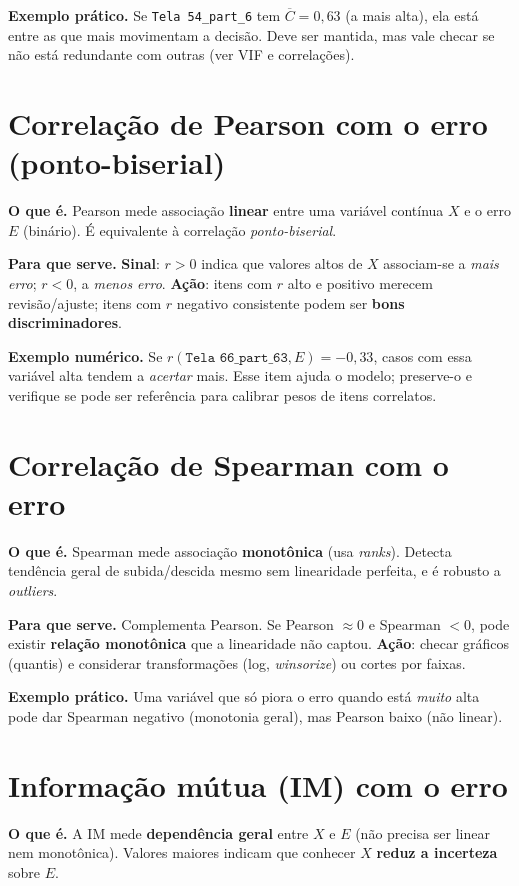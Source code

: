 \documentclass[12pt,a4paper]{article}
\begin{document}
\textbf{Exemplo prático.} Se \texttt{Tela 54\_part\_6} tem $\overline{C}=0{,}63$ (a mais alta), ela está entre as que mais movimentam a decisão. Deve ser mantida, mas vale checar se não está redundante com outras (ver VIF e correlações).

\section{Correlação de Pearson com o erro (ponto-biserial)}\label{sec:pearson}
\textbf{O que é.} Pearson mede associação \textbf{linear} entre uma variável contínua $X$ e o erro $E$ (binário). É equivalente à correlação \emph{ponto-biserial}.

\textbf{Para que serve.} \textbf{Sinal}: $r>0$ indica que valores altos de $X$ associam-se a \emph{mais erro}; $r<0$, a \emph{menos erro}. \textbf{Ação}: itens com $r$ alto e positivo merecem revisão/ajuste; itens com $r$ negativo consistente podem ser \textbf{bons discriminadores}.

\textbf{Exemplo numérico.} Se $r(\texttt{Tela 66\_part\_63},E)=-0{,}33$, casos com essa variável alta tendem a \emph{acertar} mais. Esse item ajuda o modelo; preserve-o e verifique se pode ser referência para calibrar pesos de itens correlatos.

\section{Correlação de Spearman com o erro}
\textbf{O que é.} Spearman mede associação \textbf{monotônica} (usa \emph{ranks}). Detecta tendência geral de subida/descida mesmo sem linearidade perfeita, e é robusto a \emph{outliers}.

\textbf{Para que serve.} Complementa Pearson. Se Pearson $\approx 0$ e Spearman $<0$, pode existir \textbf{relação monotônica} que a linearidade não captou. \textbf{Ação}: checar gráficos (quantis) e considerar transformações (log, \emph{winsorize}) ou cortes por faixas.

\textbf{Exemplo prático.} Uma variável que só piora o erro quando está \emph{muito} alta pode dar Spearman negativo (monotonia geral), mas Pearson baixo (não linear).

\section{Informação mútua (IM) com o erro}
\textbf{O que é.} A IM mede \textbf{dependência geral} entre $X$ e $E$ (não precisa ser linear nem monotônica). Valores maiores indicam que conhecer $X$ \textbf{reduz a incerteza} sobre $E$.
\end{document}
